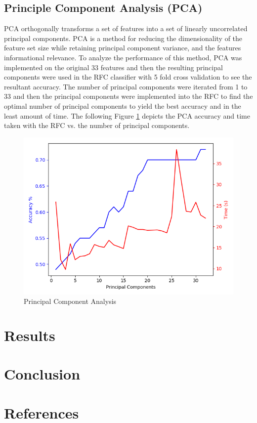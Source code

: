 \documentclass{article}
\begin{document}
\subsection{\color{red}Principle Component Analysis (PCA)}
PCA orthogonally transforms a set of features into a set of linearly uncorrelated principal components. PCA is a method for reducing the dimensionality of the feature set size while retaining principal component variance, and the features informational relevance. To analyze the performance of this method, PCA was implemented on the original 33 features and then the resulting principal components were used in the RFC classifier with 5 fold cross validation to see the resultant accuracy. The number of principal components were iterated from 1 to 33 and then the principal components were implemented into the RFC to find the optimal number of principal components to yield the best accuracy and in the least amount of time. The following Figure \ref{fig:PCA} depicts the PCA accuracy and time taken with the RFC vs. the number of principal components.   

\begin{figure}[h!]
	\centering
	\includegraphics[width=\linewidth]{data/PCAT1.png}
	\caption{Principal Component Analysis}
	\label{fig:PCA}
\end{figure}

\section{Results}
\section{Conclusion}

\section*{References}
 

\end{document}
